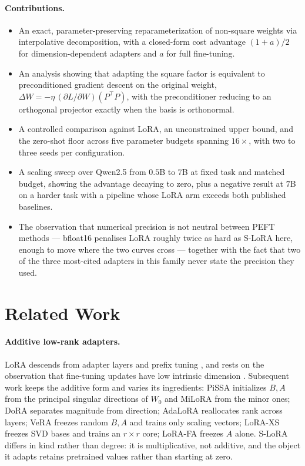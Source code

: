 \documentclass{article}
\theoremstyle{remark}
\begin{document}
\paragraph{Contributions.}
\begin{itemize}
  \item An exact, parameter-preserving reparameterization of non-square weights
        via interpolative decomposition, with a closed-form cost advantage
        $(1+a)/2$ for dimension-dependent adapters and $a$ for full
        fine-tuning.
  \item An analysis showing that adapting the square factor is equivalent to
        preconditioned gradient descent on the original weight,
        $\Delta W=-\eta\,(\partial L/\partial W)(P^{\top}P)$, with the
        preconditioner reducing to an orthogonal projector exactly when the
        basis is orthonormal.
  \item A controlled comparison against LoRA, an unconstrained upper bound, and
        the zero-shot floor across five parameter budgets spanning $16\times$,
        with two to three seeds per configuration.
  \item A scaling sweep over Qwen2.5 from $0.5$B to $7$B at fixed task and
        matched budget, showing the advantage decaying to zero, plus a negative
        result at $7$B on a harder task with a pipeline whose LoRA arm exceeds
        both published baselines.
  \item The observation that numerical precision is not neutral between PEFT
        methods --- bfloat16 penalises LoRA roughly twice as hard as S-LoRA here,
        enough to move where the two curves cross --- together with the fact that
        two of the three most-cited adapters in this family never state the
        precision they used.
\end{itemize}

\section{Related Work}

\paragraph{Additive low-rank adapters.}
LoRA \citep{hu2022lora} descends from adapter layers
\citep{houlsby2019adapter} and prefix tuning \citep{li2021prefix}, and rests on
the observation that fine-tuning updates have low intrinsic dimension
\citep{aghajanyan2021intrinsic}. Subsequent work keeps the additive form and
varies its ingredients: PiSSA \citep{meng2024pissa} initializes $B,A$ from the
principal singular directions of $W_0$ and MiLoRA \citep{wang2025milora} from
the minor ones; DoRA \citep{liu2024dora} separates magnitude from direction;
AdaLoRA \citep{zhang2023adalora} reallocates rank across layers; VeRA
\citep{kopiczko2024vera} freezes random $B,A$ and trains only scaling vectors;
LoRA-XS \citep{balazy2024loraxs} freezes SVD bases and trains an $r\times r$
core; LoRA-FA \citep{zhang2023lorafa} freezes $A$ alone. S-LoRA differs in
kind rather than degree: it is multiplicative, not additive, and the object it
adapts retains pretrained values rather than starting at zero.
\end{document}
